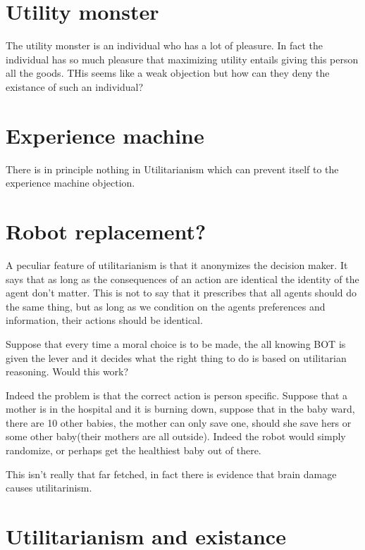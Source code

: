 \documentclass[12pt]{report}
\numberwithin{equation}{section}
\begin{document}
\section{Utility monster}


The utility monster is an individual who has a lot of pleasure. In fact the individual has so much pleasure that maximizing utility entails giving this person all the goods. THis seems like a weak objection but how can they deny the existance of such an individual? 


\section{Experience machine}

There is in principle nothing in Utilitarianism which can prevent itself to the experience machine objection. 

\section{Robot replacement?}


A peculiar feature of utilitarianism is that it anonymizes the decision maker. It says that as long as the consequences of an action are identical the identity of the agent don't matter. This is not to say that it prescribes that all agents should do the same thing, but as long as we condition on the agents preferences and information, their actions should be identical. 

Suppose that every time a moral choice is to be made, the all knowing BOT is given the lever and it decides what the right thing to do is based on utilitarian reasoning. Would this work? 

Indeed the problem is that the correct action is person specific. Suppose that a mother is in the hospital and it is burning down, suppose that in the baby ward, there are 10 other babies, the mother can only save one, should she save hers or some other baby(their mothers are all outside). Indeed the robot would simply randomize, or perhaps get the healthiest baby out of there. 

This isn't really that far fetched, in fact there is evidence that brain damage causes utilitarinism. 

\section{Utilitarianism and existance}
\end{document}

